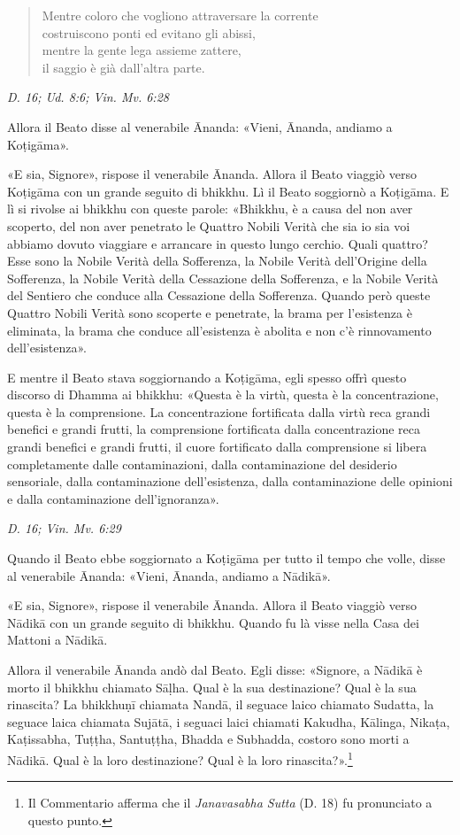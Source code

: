 \begin{quote}
Mentre coloro che vogliono attraversare la corrente \\
costruiscono ponti ed evitano gli abissi, \\
mentre la gente lega assieme zattere, \\
il saggio è già dall’altra parte.
\end{quote}

\emph{D. 16; Ud. 8:6; Vin. Mv. 6:28}


Allora il Beato disse al venerabile Ānanda: «Vieni, Ānanda, andiamo a
Koṭigāma».


«E sia, Signore», rispose il venerabile Ānanda. Allora il Beato viaggiò
verso Koṭigāma con un grande seguito di bhikkhu. Lì il Beato soggiornò a
Koṭigāma. E lì si rivolse ai bhikkhu con queste parole: «Bhikkhu, è a
causa del non aver scoperto, del non aver penetrato le Quattro Nobili
Verità che sia io sia voi abbiamo dovuto viaggiare e arrancare in questo
lungo cerchio. Quali quattro? Esse sono la Nobile Verità della
Sofferenza, la Nobile Verità dell’Origine della Sofferenza, la Nobile
Verità della Cessazione della Sofferenza, e la Nobile Verità del
Sentiero che conduce alla Cessazione della Sofferenza. Quando però
queste Quattro Nobili Verità sono scoperte e penetrate, la brama per
l’esistenza è eliminata, la brama che conduce all’esistenza è abolita e
non c’è rinnovamento dell’esistenza».


E mentre il Beato stava soggiornando a Koṭigāma, egli spesso offrì
questo discorso di Dhamma ai bhikkhu: «Questa è la virtù, questa è la
concentrazione, questa è la comprensione. La concentrazione fortificata
dalla virtù reca grandi benefici e grandi frutti, la comprensione
fortificata dalla concentrazione reca grandi benefici e grandi frutti,
il cuore fortificato dalla comprensione si libera completamente dalle
contaminazioni, dalla contaminazione del desiderio sensoriale, dalla
contaminazione dell’esistenza, dalla contaminazione delle opinioni e
dalla contaminazione dell’ignoranza».


\emph{D. 16; Vin. Mv. 6:29}


Quando il Beato ebbe soggiornato a Koṭigāma per tutto il tempo che
volle, disse al venerabile Ānanda: «Vieni, Ānanda, andiamo a Nādikā».


«E sia, Signore», rispose il venerabile Ānanda. Allora il Beato viaggiò
verso Nādikā con un grande seguito di bhikkhu. Quando fu là visse nella
Casa dei Mattoni a Nādikā.


Allora il venerabile Ānanda andò dal Beato. Egli disse: «Signore, a
Nādikā è morto il bhikkhu chiamato Sāḷha. Qual è la sua destinazione?
Qual è la sua rinascita? La bhikkhuṇī chiamata Nandā, il seguace laico
chiamato Sudatta, la seguace laica chiamata Sujātā, i seguaci laici
chiamati Kakudha, Kālinga, Nikaṭa, Kaṭissabha, Tuṭṭha, Santuṭṭha, Bhadda
e Subhadda, costoro sono morti a Nādikā. Qual è la loro destinazione?
Qual è la loro rinascita?».\footnote{Il Commentario afferma che il \emph{Janavasabha Sutta} (D. 18) fu pronunciato a questo punto.}


